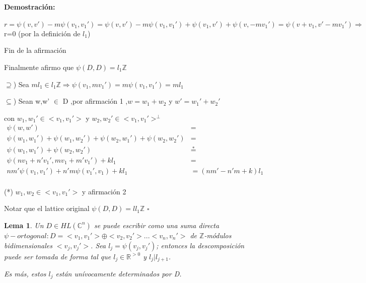 \documentclass[12pt]{article}
\newtheorem{lemma}{Lema}
\newenvironment{proof}{\paragraph{Demostración:}}{\hfill$\square$}
\begin{document}
\begin{proof}
 $r= \psi(v,v') - m \psi(v_1,v_1')=\psi(v,v')-m\psi(v_1,v_1')+ \psi (v_1,v')+ \psi(v,-m v_1') 
 = \psi(v+v_1,v'-mv_1') \Rightarrow $ r=0 (por la definición de $l_1$)
 
 Fin de la afirmación
 \newline
 
 Finalmente afirmo que $\psi(D,D)=l_1 \mathbb{Z}$ 
 
 $\supseteq$) Sea $m l_1 \in l_1 \mathbb{Z} \Rightarrow \psi(v_1,m v_1') = m \psi(v_1,v_1')= m l_1$
 
 $\subseteq$) Sean w,w' $\in$ D ,por afirmación 1 ,$w = w_1 +w_2$  y $w'=w_1' +w_2'$
 
  con $w_1,w_1' \in <v_1,v_1'>$ y  $w_2,w_2' \in <v_1,v_1'>^\bot$ 
 $$\begin{aligned}
 \psi(w,w')&=\\
 \psi(w_1,w_1')+ \psi(w_1,w_2')+ \psi(w_2,w_1')+\psi(w_2,w_2')&=\\
 \psi(w_1,w_1')+\psi(w_2,w_2')& \stackrel{*}{=} \\ 
 \psi(n v_1+n' v_1',m v_1+m' v_1') + k l_1 &=\\
 n m' \psi(v_1,v_1')+n' m \psi(v_1',v_1)+ k l_1 &= (n m' - n'm+k)l_1\\
 \end{aligned}$$
 \newline 
 
 (*) $w_1,w_2 \in <v_1,v_1'>$ y afirmación 2
 
 Notar que el lattice original $\psi(D,D)= l l_1 \mathbb{Z} $
\end{proof}

\begin{lemma} \label{1.8}
 Un $D \in HL(\mathbb{C}^n)$ se puede escribir como una suma directa $\psi-ortogonal : D=<v_1,v_1'>\oplus<v_2,v_2'>...<v_n,v_n'>$
 de $\mathbb{Z}$-módulos bidimensionales $<v_j,v_j'>$. Sea $l_j=\psi(v_j,v_j')$; entonces la descomposición puede ser tomada 
 de forma tal que $l_j \in \mathbb{R}^{>0}$ y $l_j | l_{j+1}$.
 
 Es más, estos $l_j$ están unívocamente determinados por D.
\end{lemma}
\end{document}
